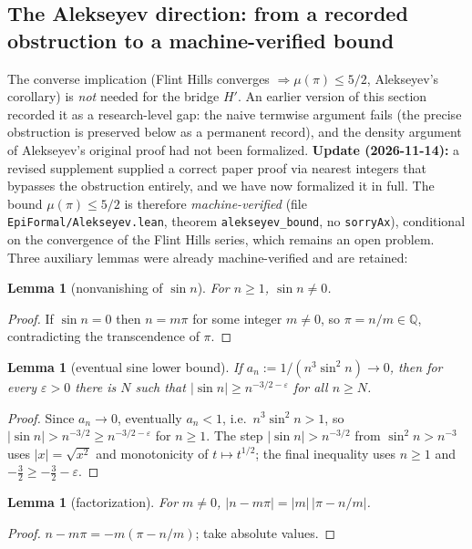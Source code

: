 \documentclass[11pt]{amsart}
\newtheorem{lemma}[theorem]{Lemma}
\theoremstyle{definition}
\theoremstyle{remark}
\numberwithin{equation}{section}
\newcommand{\Q}{\mathbb{Q}}
\newcommand{\irr}{\mu}
\begin{document}
\subsection{The Alekseyev direction: from a recorded obstruction to a machine-verified bound}\label{sec:alekseyev}

The converse implication (Flint Hills converges $\Rightarrow\irr(\pi)\le5/2$, Alekseyev's corollary) is \emph{not} needed for the bridge $H'$. An earlier version of this section recorded it as a research-level gap: the naive termwise argument fails (the precise obstruction is preserved below as a permanent record), and the density argument of Alekseyev's original proof had not been formalized. \textbf{Update (2026-11-14):} a revised supplement supplied a correct paper proof via nearest integers that bypasses the obstruction entirely, and we have now formalized it in full. The bound $\irr(\pi)\le5/2$ is therefore \emph{machine-verified} (file \texttt{EpiFormal/\allowbreak{}Alekseyev.lean}, theorem \texttt{alekseyev\_\allowbreak{}bound}, no \texttt{sorryAx}), conditional on the convergence of the Flint Hills series, which remains an open problem. Three auxiliary lemmas were already machine-verified and are retained:

\begin{lemma}[nonvanishing of $\sin n$] For $n\ge1$, $\sin n\ne0$.
\end{lemma}
\begin{proof} If $\sin n=0$ then $n=m\pi$ for some integer $m\ne0$, so $\pi=n/m\in\Q$, contradicting the transcendence of $\pi$.
\end{proof}

\begin{lemma}[eventual sine lower bound]\label{lem:sin-lower} If $a_n:=1/(n^3\sin^2 n)\to0$, then for every $\varepsilon>0$ there is $N$ such that $|\sin n|\ge n^{-3/2-\varepsilon}$ for all $n\ge N$.
\end{lemma}
\begin{proof} Since $a_n\to0$, eventually $a_n<1$, i.e.\ $n^3\sin^2 n>1$, so $|\sin n|>n^{-3/2}\ge n^{-3/2-\varepsilon}$ for $n\ge1$. The step $|\sin n|>n^{-3/2}$ from $\sin^2 n>n^{-3}$ uses $|x|=\sqrt{x^2}$ and monotonicity of $t\mapsto t^{1/2}$; the final inequality uses $n\ge1$ and $-\tfrac32\ge-\tfrac32-\varepsilon$.
\end{proof}

\begin{lemma}[factorization] For $m\ne0$, $|n-m\pi|=|m|\,|\pi-n/m|$.
\end{lemma}
\begin{proof} $n-m\pi=-m(\pi-n/m)$; take absolute values.
\end{proof}
\end{document}
